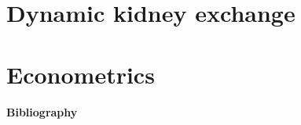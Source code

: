 \documentclass[12pt,a4paper,oneside]{book}
\theoremstyle{definition}
\theoremstyle{Assumption}
\begin{document}
\frontmatter

\setcounter{page}{2}




\clearpage
\onehalfspacing
\tableofcontents
 
{}
{}
\listoffigures

{}
{}
\listoftables

\clearpage
%

 
\mainmatter
\part{Dynamic kidney exchange}


\part{Econometrics}



 
\appendix
\backmatter


\begingroup
\renewcommand{\chapter}[2]{}%
\begin{center}
  {\vspace*{-1cm}\selectfont\huge\bfseries  Bibliography}
\end{center}

\singlespacing


\end{document}
